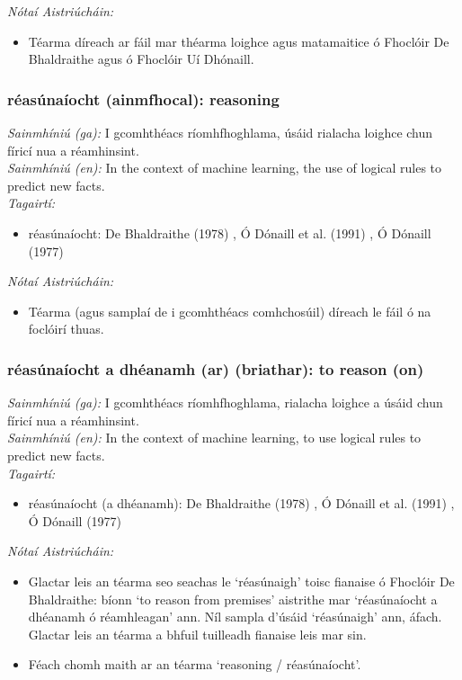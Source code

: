 \noindent \textit{Nótaí Aistriúcháin:}
\begin{itemize}
	\item Téarma díreach ar fáil mar théarma loighce agus matamaitice ó Fhoclóir De Bhaldraithe agus ó Fhoclóir Uí Dhónaill.
\end{itemize}


\subsubsection*{réasúnaíocht (ainmfhocal): reasoning}
 \noindent \textit{Sainmhíniú (ga):} I gcomhthéacs ríomhfhoghlama, úsáid rialacha loighce chun fíricí nua a réamhinsint.
\\
 \noindent \textit{Sainmhíniú (en):} In the context of machine learning, the use of logical rules to predict new facts.
\\
 \noindent \textit{Tagairtí:}
\begin{itemize}
	\item réasúnaíocht: De Bhaldraithe (1978) \cite{de-bhaldraithe}, Ó Dónaill et al. (1991) \cite{focloir-beag}, Ó Dónaill (1977) \cite{odonaill}
\end{itemize}

 \noindent \textit{Nótaí Aistriúcháin:}
\begin{itemize}
	\item Téarma (agus samplaí de i gcomhthéacs comhchosúil) díreach le fáil ó na foclóirí thuas.
\end{itemize}


\subsubsection*{réasúnaíocht a dhéanamh (ar) (briathar): to reason (on)}
 \noindent \textit{Sainmhíniú (ga):} I gcomhthéacs ríomhfhoghlama, rialacha loighce a úsáid chun fíricí nua a réamhinsint.
\\
 \noindent \textit{Sainmhíniú (en):} In the context of machine learning, to use logical rules to predict new facts.
\\
 \noindent \textit{Tagairtí:}
\begin{itemize}
	\item réasúnaíocht (a dhéanamh): De Bhaldraithe (1978) \cite{de-bhaldraithe}, Ó Dónaill et al. (1991) \cite{focloir-beag}, Ó Dónaill (1977) \cite{odonaill}
\end{itemize}

 \noindent \textit{Nótaí Aistriúcháin:}
\begin{itemize}
	\item Glactar leis an téarma seo seachas le `réasúnaigh' toisc fianaise ó Fhoclóir De Bhaldraithe: bíonn `to reason from premises' aistrithe mar `réasúnaíocht a dhéanamh ó réamhleagan' ann. Níl sampla d'úsáid `réasúnaigh' ann, áfach. Glactar leis an téarma a bhfuil tuilleadh fianaise leis mar sin.
	\item Féach chomh maith ar an téarma `reasoning / réasúnaíocht'.
\end{itemize}


